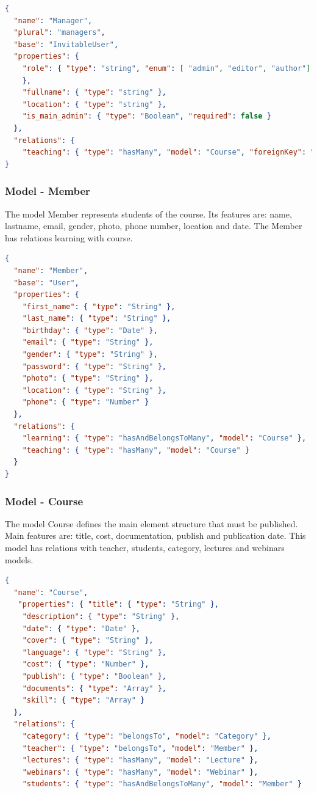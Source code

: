 \begin{lstlisting}[language=json]
{
  "name": "Manager",
  "plural": "managers",
  "base": "InvitableUser",
  "properties": {
    "role": { "type": "string", "enum": [ "admin", "editor", "author"]
    },
    "fullname": { "type": "string" },
    "location": { "type": "string" },
    "is_main_admin": { "type": "Boolean", "required": false }
  },
  "relations": {
    "teaching": { "type": "hasMany", "model": "Course", "foreignKey": "teacher_id" }
}
\end{lstlisting}


\subsubsection{ Model - Member}

The model Member represents students of the course. Its features are: name, lastname, email, gender, photo, phone number, location and date. The Member has relations learning with course.

\begin{lstlisting}[language=json]
{
  "name": "Member",
  "base": "User",
  "properties": {
    "first_name": { "type": "String" },
    "last_name": { "type": "String" },   
    "birthday": { "type": "Date" },
    "email": { "type": "String" },
    "gender": { "type": "String" },
    "password": { "type": "String" },
    "photo": { "type": "String" },
    "location": { "type": "String" },
    "phone": { "type": "Number" }
  },
  "relations": {
    "learning": { "type": "hasAndBelongsToMany", "model": "Course" },
    "teaching": { "type": "hasMany", "model": "Course" }
  }
}
\end{lstlisting}


\subsubsection{ Model - Course}

The model Course defines the main element structure that must be published. Main features are: title, cost, documentation, publish and publication date. This model has relations with teacher, students, category, lectures and webinars models.


\begin{lstlisting}[language=json]
{
  "name": "Course",
   "properties": { "title": { "type": "String" },
    "description": { "type": "String" },
    "date": { "type": "Date" },
    "cover": { "type": "String" },
    "language": { "type": "String" },
    "cost": { "type": "Number" },
    "publish": { "type": "Boolean" },
    "documents": { "type": "Array" },
    "skill": { "type": "Array" }
  },
  "relations": {
    "category": { "type": "belongsTo", "model": "Category" },
    "teacher": { "type": "belongsTo", "model": "Member" },
    "lectures": { "type": "hasMany", "model": "Lecture" },
    "webinars": { "type": "hasMany", "model": "Webinar" },
    "students": { "type": "hasAndBelongsToMany", "model": "Member" }

\end{lstlisting}

